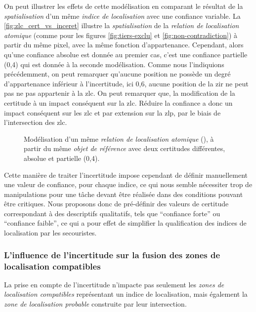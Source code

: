 On peut illustrer les effets de cette modélisation en comparant le
résultat de la \emph{spatialisation} d'un même \emph{indice de
  localisation} avec une confiance variable. La
\autoref{fig:zlc_cert_vs_inceret} illustre la \emph{spatialisation} de
la \emph{relation de localisation atomique} 
(comme pour les figures \ref{fig:tiers-exclu} et
\ref{fig:non-contradiction}) à partir du même pixel, avec la même
fonction d'appartenance. Cependant, alors qu'une confiance absolue est
donnée au premier cas, c'est une confiance partielle (0,4) qui est
donnée à la seconde modélisation. Comme nous l'indiquions
précédemment, on peut remarquer qu'aucune position ne possède un degré
d'appartenance inférieur à l'incertitude, ici 0,6, aucune position de
la \ac{zir} ne peut pas ne pas appartenir à la \ac{zlc}. On peut
remarquer que, la modification de la certitude à un impact conséquent
sur la \ac{zlc}. Réduire la confiance a donc un impact conséquent sur
les \ac{zlc} et par extension sur la \ac{zlp}, par le biais de
l'intersection des \ac{zlc}.

\begin{figure}
  \centering
  \subfloat[]{}\hspace{2cm}
  \subfloat[]{}
  \caption{Modélisation d'un même \emph{relation de localisation
      atomique} (\protect{}), à partir du même
    \emph{objet de référence} avec deux certitudes différentes,
    absolue et partielle (0,4).}
  \label{fig:zlc_cert_vs_inceret}
\end{figure}

Cette manière de traiter l'incertitude impose cependant de définir
manuellement une valeur de confiance, pour chaque indice, ce qui nous
semble nécessiter trop de manipulations pour une tâche devant être
réalisée dans des conditions pouvant être critiques. Nous proposons
donc de pré-définir des valeurs de certitude correspondant à des
descriptifs qualitatifs, tels que \enquote{confiance forte} ou
\enquote{confiance faible}, ce qui a pour effet de simplifier la
qualification des indices de localisation par les secouristes.

\subsubsection{L'influence de l'incertitude sur la fusion des zones de
  localisation compatibles}

La prise en compte de l'incertitude n'impacte pas seulement les
\emph{zones de localisation compatibles} représentant un indice de
localisation, mais également la \emph{zone de localisation probable}
construite par leur intersection.

